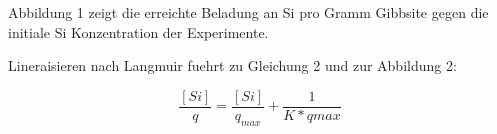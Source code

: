 Abbildung 1 zeigt die erreichte Beladung an Si pro Gramm Gibbsite gegen die initiale Si Konzentration der Experimente.


Lineraisieren nach Langmuir fuehrt zu Gleichung 2 und zur Abbildung 2:


\begin{equation}
\frac{[Si]}{q}=\frac{[Si]}{q_{max}}+\frac{1}{K*q{max}}
\end{equation}
